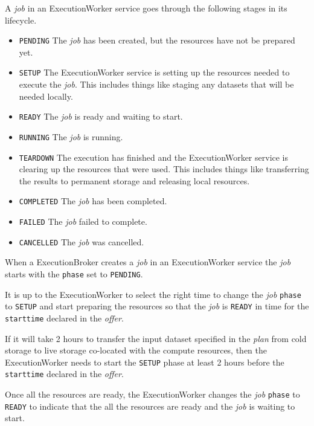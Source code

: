 \documentclass[11pt,a4paper]{ivoa}
\newcommand{\execbrokerclass} {ExecutionBroker}
\newcommand{\execworkerclass} {ExecutionWorker}
\newcommand{\codeword}[1] {\texttt{#1}}
\newcommand{\dataset} {dataset}
\newcommand{\execplan} {\textit{plan}}
\newcommand{\execoffer} {\textit{offer}}
\newcommand{\workerjob} {\textit{job}}
\begin{document}
A \workerjob{} in an \execworkerclass{} service goes through the following stages in its lifecycle.

\begin{itemize}
    \item \codeword{PENDING}   The \workerjob{} has been created, but the resources have not be prepared yet.
    \item \codeword{SETUP}     The \execworkerclass{} service is setting up the resources needed to execute the \workerjob{}.
                               This includes things like staging any \dataset{}s that will be needed locally.
    \item \codeword{READY}     The \workerjob{} is ready and waiting to start.
    \item \codeword{RUNNING}   The \workerjob{} is running.
    \item \codeword{TEARDOWN}  The execution has finished and the \execworkerclass{} service is clearing up the resources that were used.
                               This includes things like transferring the results to permanent storage and releasing local resources.
    \item \codeword{COMPLETED} The \workerjob{} has been completed.
    \item \codeword{FAILED}    The \workerjob{} failed to complete.
    \item \codeword{CANCELLED} The \workerjob{} was cancelled.
\end{itemize}

When a \execbrokerclass{} creates a \workerjob{} in an \execworkerclass{} service the
\workerjob{} starts with the \codeword{phase} set to \codeword{PENDING}.

It is up to the \execworkerclass{} to select the right time to change the \workerjob{}
\codeword{phase} to \codeword{SETUP} and start preparing the resources so that
the \workerjob{} is \codeword{READY} in time for the \codeword{starttime} declared
in the \execoffer{}.

If it will take 2 hours to transfer the input \dataset{} specified in the \execplan{}
from cold storage to live storage co-located with the compute resources,
then the \execworkerclass{} needs to start the \codeword{SETUP} phase at least 2 hours
before the \codeword{starttime} declared in the \execoffer{}.

Once all the resources are ready, the \execworkerclass{} changes the \workerjob{}
\codeword{phase} to \codeword{READY} to indicate that the all the resources
are ready and the \workerjob{} is waiting to start.
\end{document}
